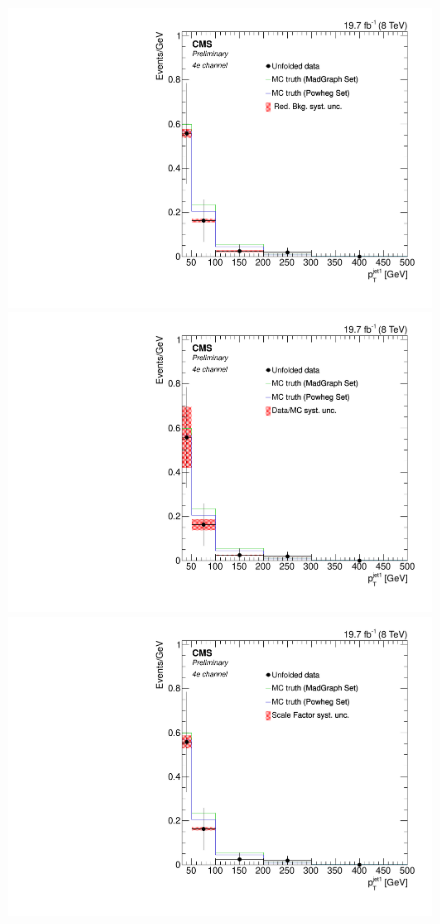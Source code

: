 \begin{figure}[hbtp]
\begin{center}
   \includegraphics[width=0.8\cmsFigWidth]{Figures/Unfolding/Systematics/ZZTo4e_PtJet1_RedBkg_Mad_fr}     
  \includegraphics[width=0.8\cmsFigWidth]{Figures/Unfolding/Systematics/ZZTo4e_PtJet1_UnfDataOverGenMC_Mad_fr}     
   \includegraphics[width=0.8\cmsFigWidth]{Figures/Unfolding/Systematics/ZZTo4e_PtJet1_SFSq_Mad_fr}

\end{center}
\end{figure}
